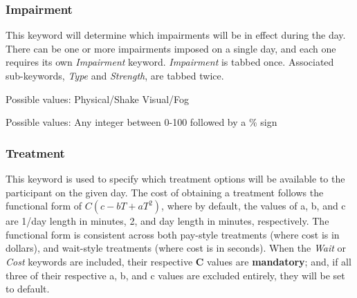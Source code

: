 \documentclass{article}
\begin{document}
\subsubsection*{Impairment}
This keyword will determine which impairments will be in effect during the day. There can be one or more impairments imposed on a single day, and each one requires its own \textit{Impairment} keyword. \textit{Impairment} is tabbed once. Associated sub-keywords, \textit{Type} and \textit{Strength}, are tabbed twice. \newline

 \newline
\indent Possible values: \newline
\indent\indent Physical/Shake \newline
\indent\indent Visual/Fog \newline


 \newline
\indent Possible values: \newline
\indent\indent Any integer between 0-100 followed by a \% sign \newline
    

\subsubsection*{Treatment}
This keyword is used to specify which treatment options will be available to the participant on the given day. The cost of obtaining a treatment follows the functional form of $C(c - bT + aT^2)$, where by default, the values of a, b, and c are 1\slash day length in minutes, 2, and day length in minutes, respectively. The functional form is consistent across both pay-style treatments (where cost is in dollars), and wait-style treatments (where cost is in seconds). When the \textit{Wait} or \textit{Cost} keywords are included, their respective \textbf{C} values are \textbf{mandatory}; and, if all three of their respective a, b, and c values are excluded entirely, they will be set to default. 
\end{document}
